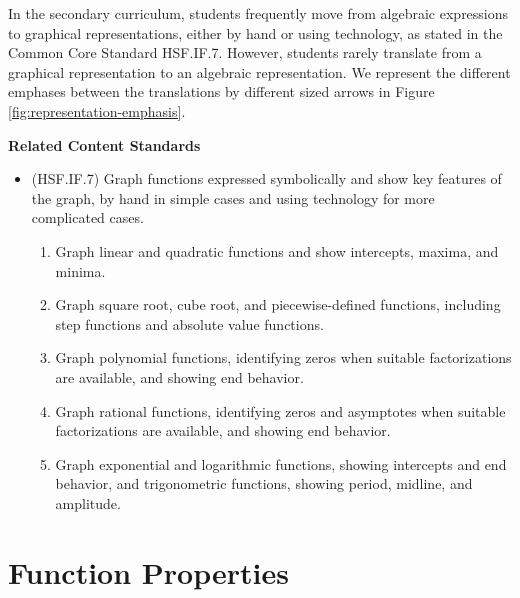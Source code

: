 \documentclass[
]{book}
\providecommand{\tightlist}{%
  \setlength{\itemsep}{0pt}\setlength{\parskip}{0pt}}
\newenvironment{standards}{}{}
\let\stdsection\section
\renewcommand\section{\newpage\stdsection}
\theoremstyle{definition}
\theoremstyle{definition}
\theoremstyle{definition}
\theoremstyle{definition}
\theoremstyle{remark}
\begin{document}
In the secondary curriculum, students frequently move from algebraic expressions to graphical representations, either by hand or using technology, as stated in the Common Core Standard HSF.IF.7. However, students rarely translate from a graphical representation to an algebraic representation. We represent the different emphases between the translations by different sized arrows in Figure \ref{fig:representation-emphasis}.

\begin{standards}

\begin{center}
\textbf{Related Content Standards}

\end{center}

\begin{itemize}
\tightlist
\item
  (HSF.IF.7) Graph functions expressed symbolically and show key features of the graph, by hand in simple cases and using technology for more complicated cases.

  \begin{enumerate}
  \def\labelenumi{\alph{enumi}.}
  \tightlist
  \item
    Graph linear and quadratic functions and show intercepts, maxima, and minima.
  \item
    Graph square root, cube root, and piecewise-defined functions, including step functions and absolute value functions.
  \item
    Graph polynomial functions, identifying zeros when suitable factorizations are available, and showing end behavior.
  \item
    Graph rational functions, identifying zeros and asymptotes when suitable factorizations are available, and showing end behavior.
  \item
    Graph exponential and logarithmic functions, showing intercepts and end behavior, and trigonometric functions, showing period, midline, and amplitude.
  \end{enumerate}
\end{itemize}

\end{standards}

\hypertarget{function-properties}{%
\section{Function Properties}\label{function-properties}}
\end{document}
